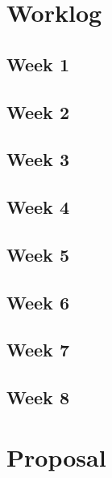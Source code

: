 \providecommand{\tightlist}{%
  \setlength{\itemsep}{0pt}\setlength{\parskip}{0pt}%
}

\section{Worklog}



\subsection{Week 1}


\subsection{Week 2}


\subsection{Week 3}


\subsection{Week 4}


\subsection{Week 5}


\subsection{Week 6}


\subsection{Week 7}


\subsection{Week 8}


\newpage

\section{Proposal}

